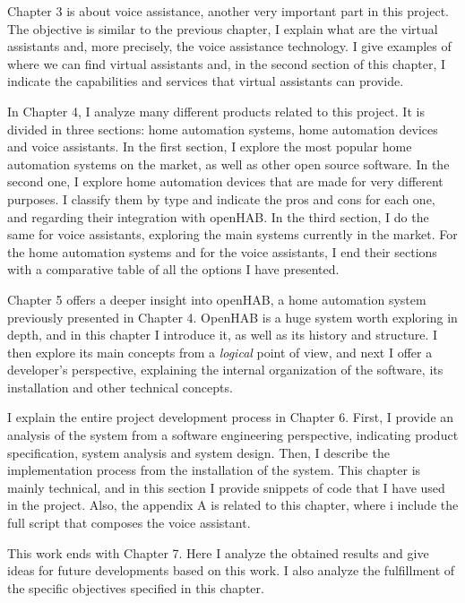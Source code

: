 Chapter 3 is about voice assistance, another very important part in this project. The objective is similar to the previous 
chapter, I explain what are the virtual assistants and, more precisely, the voice assistance technology. I give examples of where
we can find virtual assistants and, in the second section of this chapter, I indicate the capabilities and services that virtual 
assistants can provide.

In Chapter 4, I analyze many different products related to this project. It is divided in three sections: home automation 
systems, home automation devices and voice assistants. In the first section, I explore the most popular home automation systems
on the market, as well as other open source software. In the second one, I explore home automation devices that are made for very
different purposes. I classify them by type and indicate the pros and cons for each one, and regarding their integration with openHAB.
In the third section, I do the same for voice assistants, exploring the main systems currently in the market. For the home automation 
systems and for the voice assistants, I end their sections with a comparative table of all the options I have presented.

Chapter 5 offers a deeper insight into openHAB, a home automation system previously presented in Chapter 4. OpenHAB is a 
huge system worth exploring in depth, and in this chapter I introduce it, as well as its history and structure. I then explore its 
main concepts from a \textit{logical} point of view, and next I offer a developer's perspective, explaining the internal organization 
of the software, its installation and other technical concepts.

I explain the entire project development process in Chapter 6. First, I provide an analysis of the system from a software
engineering perspective, indicating product specification, system analysis and system design. Then, I describe the implementation
process from the installation of the system. This chapter is mainly technical, and in this section I provide snippets of code that
I have used in the project. Also, the  appendix A is related to this chapter, where i include the full script that composes 
the voice assistant.

This work ends with Chapter 7. Here I analyze the obtained results and give ideas for future developments based on this
work. I also analyze the fulfillment of the specific objectives specified in this chapter.


